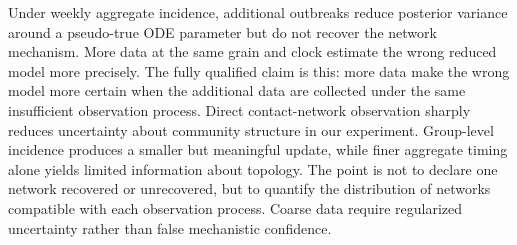 \documentclass[11pt]{article}
\begin{document}
Under weekly aggregate incidence, additional outbreaks reduce posterior variance
around a pseudo-true ODE parameter but do not recover the network mechanism. More
data at the same grain and clock estimate the wrong reduced model more precisely.
The fully qualified claim is this: more data make the wrong model more certain when
the additional data are collected under the same insufficient observation process.
Direct contact-network observation sharply reduces uncertainty about community
structure in our experiment. Group-level incidence produces a smaller but meaningful
update, while finer aggregate timing alone yields limited information about topology.
The point is not to declare one network recovered or unrecovered, but to quantify
the distribution of networks compatible with each observation process. Coarse data
require regularized uncertainty rather than false mechanistic confidence.



\end{document}
